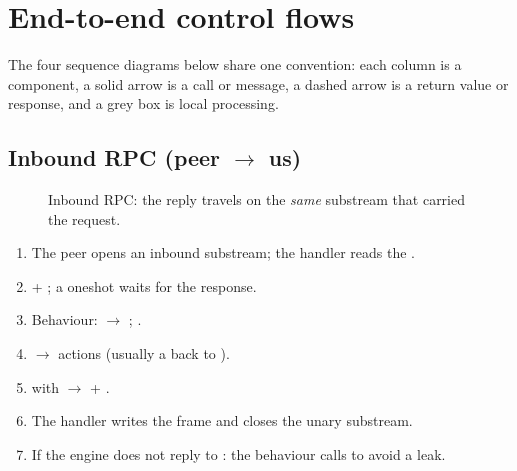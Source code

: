 \section{End-to-end control flows}

The four sequence diagrams below share one convention: each column is a component, a solid arrow
is a call or message, a dashed arrow is a return value or response, and a grey box is local
processing.

\subsection{Inbound RPC (peer $\rightarrow$ us)}

\begin{figure}[H]
\centering
{}
\caption{Inbound RPC: the reply travels on the \emph{same} substream that carried the request.}
\end{figure}

\begin{enumerate}[label=\arabic*., nosep]
  \item The peer opens an inbound substream; the handler reads the .
  \item {} + ; a oneshot waits for the response.
  \item Behaviour:  $\rightarrow$ ; .
  \item {} $\rightarrow$ actions (usually a  back to ).
  \item {} with  $\rightarrow$  + .
  \item The handler writes the frame and closes the unary substream.
  \item If the engine does not reply to : the behaviour calls  to avoid a leak.
\end{enumerate}

